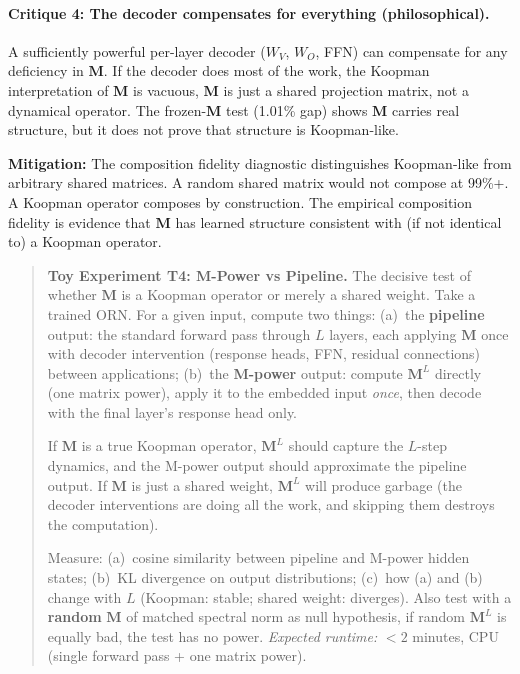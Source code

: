 \documentclass[11pt, a4paper]{article}
\newcommand{\M}{\mathbf{M}}
\theoremstyle{plain}
\theoremstyle{remark}
\begin{document}
\paragraph{Critique 4: The decoder compensates for everything (philosophical).}
A sufficiently powerful per-layer decoder ($W_V$, $W_O$, FFN) can compensate for any deficiency in $\M$.
If the decoder does most of the work, the Koopman interpretation of $\M$ is vacuous, $\M$ is just a shared projection matrix, not a dynamical operator.
The frozen-$\M$ test (1.01\% gap) shows $\M$ carries real structure, but it does not prove that structure is Koopman-like.

\textbf{Mitigation:} The composition fidelity diagnostic distinguishes Koopman-like from arbitrary shared matrices.
A random shared matrix would not compose at 99\%+.
A Koopman operator composes by construction.
The empirical composition fidelity is evidence that $\M$ has learned structure consistent with (if not identical to) a Koopman operator.

\begin{quote}\small
\textbf{Toy Experiment T4: M-Power vs Pipeline.}
The decisive test of whether $\M$ is a Koopman operator or merely a shared weight.
Take a trained ORN.
For a given input, compute two things:
(a)~the \textbf{pipeline} output: the standard forward pass through $L$ layers, each applying $\M$ once with decoder intervention (response heads, FFN, residual connections) between applications;
(b)~the \textbf{M-power} output: compute $\M^L$ directly (one matrix power), apply it to the embedded input \emph{once}, then decode with the final layer's response head only.

If $\M$ is a true Koopman operator, $\M^L$ should capture the $L$-step dynamics, and the M-power output should approximate the pipeline output.
If $\M$ is just a shared weight, $\M^L$ will produce garbage (the decoder interventions are doing all the work, and skipping them destroys the computation).

Measure: (a)~cosine similarity between pipeline and M-power hidden states; (b)~KL divergence on output distributions; (c)~how (a) and (b) change with $L$ (Koopman: stable; shared weight: diverges).
Also test with a \textbf{random} $\M$ of matched spectral norm as null hypothesis, if random $\M^L$ is equally bad, the test has no power.
\emph{Expected runtime:} $<2$ minutes, CPU (single forward pass + one matrix power).
\end{quote}
\end{document}
